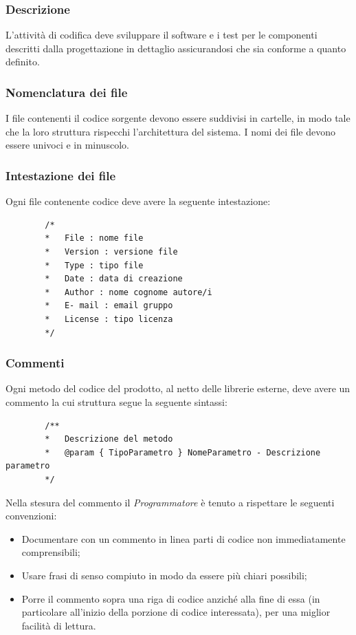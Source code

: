 \documentclass[../NomeDocumento.tex]{subfiles}
\begin{document}
	\subsubsection{Descrizione}
	L'attività di codifica deve sviluppare il software e i test per le componenti descritti dalla progettazione in dettaglio assicurandosi che sia conforme a quanto definito. 
	
	\subsubsection{Nomenclatura dei file}
	I file contenenti il codice sorgente devono essere suddivisi in cartelle, in modo tale che la
	loro struttura rispecchi l’architettura del sistema. I nomi dei file devono essere univoci
	e in minuscolo.
	
	\subsubsection{Intestazione dei file}
	Ogni file contenente codice deve avere la seguente intestazione:
	
	\begin{verbatim}
		/*
		* 	File : nome file
		* 	Version : versione file
		* 	Type : tipo file
		* 	Date : data di creazione
		* 	Author : nome cognome autore/i
		* 	E- mail : email gruppo
		* 	License : tipo licenza
		*/
	\end{verbatim}

	\subsubsection{Commenti}
	Ogni metodo del codice del prodotto, al netto delle librerie esterne, deve avere un commento la cui struttura segue la seguente sintassi:
	
	\begin{verbatim}
		/**
		* 	Descrizione del metodo
		* 	@param { TipoParametro } NomeParametro - Descrizione parametro
		*/
	\end{verbatim}

	\noindent Nella stesura del commento il \textit{Programmatore} è tenuto a rispettare le seguenti convenzioni:
	\begin{itemize}
		\item Documentare con un commento in linea parti di codice non immediatamente comprensibili;
		\item Usare frasi di senso compiuto in modo da essere più chiari possibili;
		\item Porre il commento sopra una riga di codice anziché alla fine di essa (in
		particolare all’inizio della porzione di codice interessata), per una miglior facilità
		di lettura.
	\end{itemize}
	
\end{document}
